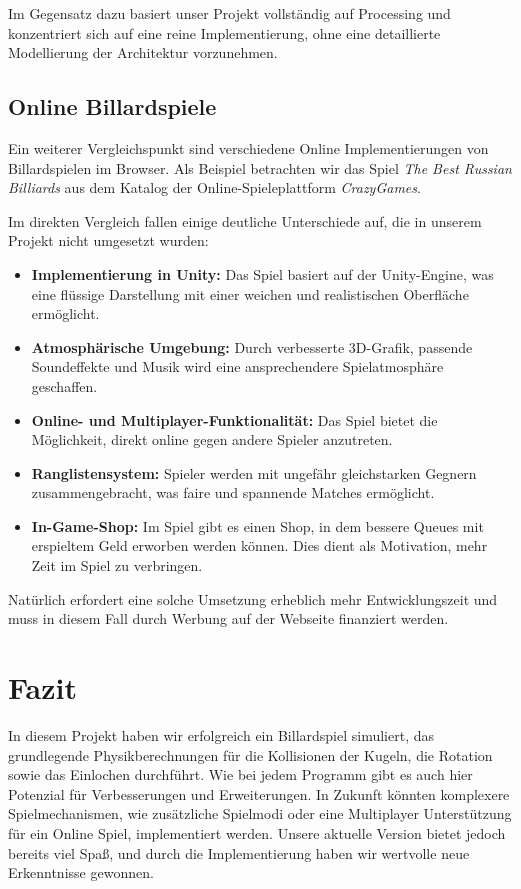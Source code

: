 \documentclass[a4paper,12pt]{article}
\begin{document}
Im Gegensatz dazu basiert unser Projekt vollständig auf Processing und konzentriert sich auf eine reine Implementierung, ohne eine detaillierte Modellierung der Architektur vorzunehmen. 
\subsection{Online Billardspiele}

Ein weiterer Vergleichspunkt sind verschiedene Online Implementierungen von Billardspielen im Browser. Als Beispiel betrachten wir das Spiel \textit{The Best Russian Billiards} \cite{The Best Russian Billiards} aus dem Katalog der Online-Spieleplattform \textit{CrazyGames}.  

Im direkten Vergleich fallen einige deutliche Unterschiede auf, die in unserem Projekt nicht umgesetzt wurden:  

\begin{itemize}
	\item \textbf{Implementierung in Unity:} Das Spiel basiert auf der Unity-Engine, was eine flüssige Darstellung mit einer weichen und realistischen Oberfläche ermöglicht.
	\item \textbf{Atmosphärische Umgebung:} Durch verbesserte 3D-Grafik, passende Soundeffekte und Musik wird eine ansprechendere Spielatmosphäre geschaffen.
	\item \textbf{Online- und Multiplayer-Funktionalität:} Das Spiel bietet die Möglichkeit, direkt online gegen andere Spieler anzutreten.
	\item \textbf{Ranglistensystem:} Spieler werden mit ungefähr gleichstarken Gegnern zusammengebracht, was faire und spannende Matches ermöglicht.
	\item \textbf{In-Game-Shop:} Im Spiel gibt es einen Shop, in dem bessere Queues mit erspieltem Geld erworben werden können. Dies dient als Motivation, mehr Zeit im Spiel zu verbringen.
\end{itemize}

Natürlich erfordert eine solche Umsetzung erheblich mehr Entwicklungszeit und muss in diesem Fall durch Werbung auf der Webseite finanziert werden.  






	
\section{Fazit}

In diesem Projekt haben wir erfolgreich ein Billardspiel simuliert, das grundlegende Physikberechnungen für die Kollisionen der Kugeln, die Rotation sowie das Einlochen durchführt. Wie bei jedem Programm gibt es auch hier Potenzial für Verbesserungen und Erweiterungen. In Zukunft könnten komplexere Spielmechanismen, wie zusätzliche Spielmodi oder eine Multiplayer Unterstützung für ein Online Spiel, implementiert werden. Unsere aktuelle Version bietet jedoch bereits viel Spaß, und durch die Implementierung haben wir wertvolle neue Erkenntnisse gewonnen.
\end{document}
